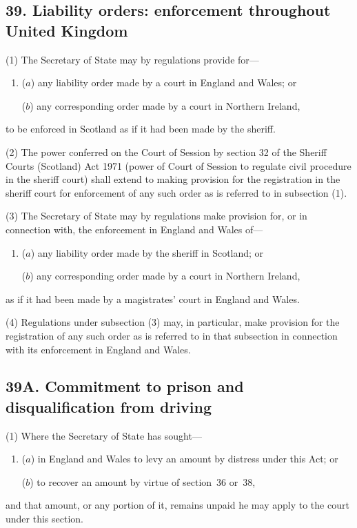 \documentclass[12pt,a4paper]{article}
\begin{document}
\subsection{39. Liability orders: enforcement throughout United Kingdom}

(1) The Secretary of State may by regulations provide for—
\begin{enumerate}\item[]
($a$) any liability order made by a court in England and Wales; or

($b$) any corresponding order made by a court in Northern Ireland,
\end{enumerate}
to be enforced in Scotland as if it had been made by the sheriff.

(2) The power conferred on the Court of Session by section 32 of the Sheriff Courts (Scotland) Act 1971 (power of Court of Session to regulate civil procedure in the sheriff court) shall extend to making provision for the registration in the sheriff court for enforcement of any such order as is referred to in subsection (1).

(3) The Secretary of State may by regulations make provision for, or in connection with, the enforcement in England and Wales of—
\begin{enumerate}\item[]
($a$) any liability order made by the sheriff in Scotland; or

($b$) any corresponding order made by a court in Northern Ireland,
\end{enumerate}
as if it had been made by a magistrates' court in England and Wales.

(4) Regulations under subsection (3)  may, in particular, make provision for the registration of any such order as is referred to in that subsection in connection with its enforcement in England and Wales.


\subsection[39A. Commitment to prison and disqualification from driving]{\sloppy 39A. Commitment to prison and disqualification from driving}

(1) Where the Secretary of State has sought—
\begin{enumerate}\item[]
($a$) in England and Wales to levy an amount by distress under this Act; or

($b$) to recover an amount by virtue of section~36 or~38,
\end{enumerate}
and that amount, or any portion of it, remains unpaid he may apply to the court under this section.
\end{document}
